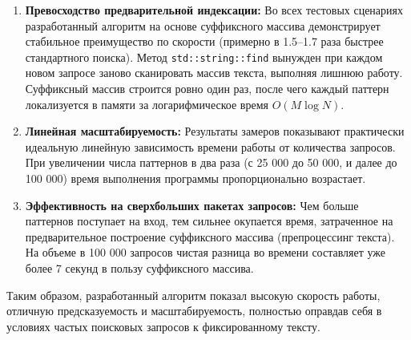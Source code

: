 \begin{enumerate}
    \item \textbf{Превосходство предварительной индексации:} Во всех тестовых сценариях разработанный алгоритм на основе суффиксного массива демонстрирует стабильное преимущество по скорости (примерно в 1.5–1.7 раза быстрее стандартного поиска). Метод \texttt{std::string::find} вынужден при каждом новом запросе заново сканировать массив текста, выполняя лишнюю работу. Суффиксный массив строится ровно один раз, после чего каждый паттерн локализуется в памяти за логарифмическое время $O(M \log N)$.
    
    \item \textbf{Линейная масштабируемость:} Результаты замеров показывают практически идеальную линейную зависимость времени работы от количества запросов. При увеличении числа паттернов в два раза (с 25 000 до 50 000, и далее до 100 000) время выполнения программы пропорционально возрастает.
    
    \item \textbf{Эффективность на сверхбольших пакетах запросов:} Чем больше паттернов поступает на вход, тем сильнее окупается время, затраченное на предварительное построение суффиксного массива (препроцессинг текста). На объеме в 100 000 запросов чистая разница во времени составляет уже более 7 секунд в пользу суффиксного массива.
\end{enumerate}

Таким образом, разработанный алгоритм показал высокую скорость работы, отличную предсказуемость и масштабируемость, полностью оправдав себя в условиях частых поисковых запросов к фиксированному тексту.